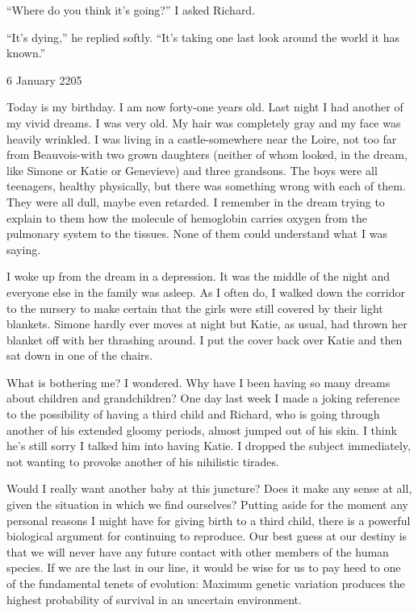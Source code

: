 \documentclass[]{article}
\begin{document}
“Where do you think it’s going?” I asked Richard.

“It’s dying,” he replied softly.  “It’s taking one last look around the world it has known.”

6 January 2205

Today is my birthday.  I am now forty-one years old.  Last night I had another of my vivid dreams.  I was very old.  My hair was completely gray and my face was heavily wrinkled.  I was living in a castle-somewhere near the Loire, not too far from Beauvois-with two grown daughters (neither of whom looked, in the dream, like Simone or Katie or Genevieve) and three grandsons.  The boys were all teenagers, healthy physically, but there was something wrong with each of them.  They were all dull, maybe even retarded.  I remember in the dream trying to explain to them how the molecule of hemoglobin carries oxygen from the pulmonary system to the tissues.  None of them could understand what I was saying.

I woke up from the dream in a depression.  It was the middle of the night and everyone else in the family was asleep.  As I often do, I walked down the corridor to the nursery to make certain that the girls were still covered by their light blankets.  Simone hardly ever moves at night but Katie, as usual, had thrown her blanket off with her thrashing around.  I put the cover back over Katie and then sat down in one of the chairs.

What is bothering me? I wondered.  Why have I been having so many dreams about children and grandchildren? One day last week I made a joking reference to the possibility of having a third child and Richard, who is going through another of his extended gloomy periods, almost jumped out of his skin.  I think he’s still sorry I talked him into having Katie.  I dropped the subject immediately, not wanting to provoke another of his nihilistic tirades.

Would I really want another baby at this juncture? Does it make any sense at all, given the situation in which we find ourselves? Putting aside for the moment any personal reasons I might have for giving birth to a third child, there is a powerful biological argument for continuing to reproduce.  Our best guess at our destiny is that we will never have any future contact with other members of the human species.  If we are the last in our line, it would be wise for us to pay heed to one of the fundamental tenets of evolution: Maximum genetic variation produces the highest probability of survival in an uncertain environment.
\end{document}
